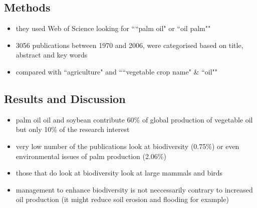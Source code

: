\subsection*{Methods}
\begin{itemize}
	\item they used Web of Science looking for ````palm oil" or ``oil palm""
	\item 3056 publications between 1970 and 2006, were categorised based on title, abstract and key words
	\item compared with ``agriculture" and ````vegetable crop name" \& ``oil""
\end{itemize}


\subsection*{Results and Discussion}
\begin{itemize}
	\item palm oil oil and soybean contribute 60\% of global production of vegetable oil but only 10\% of the research interest
	\item very low number of the publications look at biodiversity (0.75\%) or even environmental issues of palm production (2.06\%)
	\item those that do look at biodiversity look at large mammals and birds
	\item management to enhance biodiversity is not neccessarily contrary to increased oil production (it might reduce soil erosion and flooding for example)
\end{itemize}